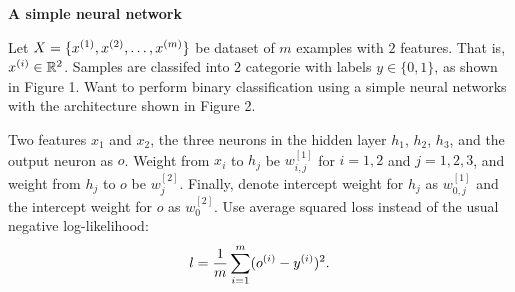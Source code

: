\documentclass[12pt,letterpaper,boxed]{hmcpset}
\begin{document}

\begin{problem}[Problem 1]
  \textbf{A simple neural network}
  
  Let $X = \{ \xx[1], \xx[2], \dots, \xx[m] \}$ be dataset of $m$ examples with $2$ features. That is, $\xx \in \R^2$. Samples are classifed into $2$ categorie with labels $y \in \{0, 1\}$, as shown in Figure 1. Want to perform binary classification using a simple neural networks with the architecture shown in Figure 2.

  Two features $x_1$ and $x_2$, the three neurons in the hidden layer $h_1$, $h_2$, $h_3$, and the output neuron as $o$. Weight from $x_i$ to $h_j$ be $w_{i,j}^{[1]}$ for $i = 1,2$ and $j = 1,2,3$, and weight from $h_j$ to $o$ be $w_j^{[2]}$. Finally, denote intercept weight for $h_j$ as $w_{0,j}^{[1]}$ and the intercept weight for $o$ as $w_0^{[2]}$. Use average squared loss instead of the usual negative log-likelihood:
  \[
    l = \frac{1}{m} \sum_{i=1}^{m} (\oo - \yy) ^2.
  \]
\end{problem}
\end{document}
